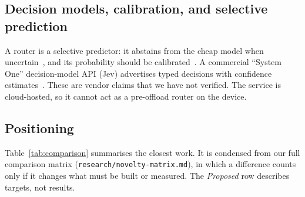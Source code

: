 \documentclass[lettersize,journal]{IEEEtran}
\begin{document}
\subsection{Decision models, calibration, and selective prediction}
A router is a selective predictor: it abstains from the cheap model when
uncertain~\cite{geifman2017selective}, and its probability should be
calibrated~\cite{guo2017calibration}. A commercial ``System One'' decision-model
API (Jev) advertises typed decisions with confidence
estimates~\cite{almeida2026jev,typesafe2026systemone,typesafe2026confidencerouting}.
These are vendor claims that we have not verified. The service is cloud-hosted,
so it cannot act as a pre-offload router on the device.

\subsection{Positioning}
\label{sec:related:open}
Table~\ref{tab:comparison} summarises the closest work. It is condensed from
our full comparison matrix (\texttt{research/novelty-matrix.md}), in which a
difference counts only if it changes what must be built or measured. The
\emph{Proposed} row describes targets, not results.
\end{document}
